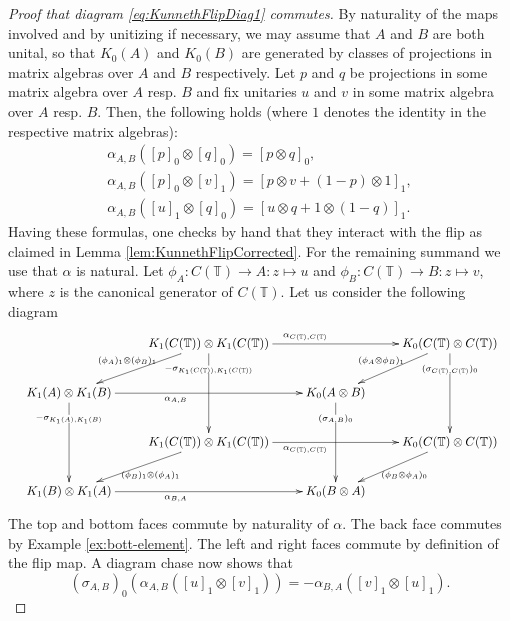 \documentclass[a4paper,10pt]{amsart}
\numberwithin{equation}{section}
\numberwithin{theorem}{section}
\begin{document}
\begin{proof}[Proof that diagram \eqref{eq:KunnethFlipDiag1} commutes] By naturality of the maps involved and by unitizing if necessary, we may assume that $A$ and $B$ are both unital, so that $K_0(A)$ and $K_0(B)$ are generated by classes of projections in matrix algebras over $A$ and $B$ respectively.
Let $p$ and $q$ be  projections in some matrix algebra over $A$ resp. $B$ and fix unitaries $u$ and $v$ in some matrix algebra over $A$ resp.  $B$. Then, the following holds (where $1$ denotes the identity in the respective matrix algebras):
\[
	\begin{array}{l}
		\alpha_{A,B}([p]_0 \otimes [q]_0) = [p \otimes q]_0, \\
		\alpha_{A,B}([p]_0 \otimes [v]_1) = [p \otimes v + (1-p) \otimes 1]_1, \\
		\alpha_{A,B}([u]_1 \otimes [q]_0) = [u \otimes q + 1 \otimes (1-q)]_1.
	\end{array}
\]
Having these formulas, one checks by hand that they interact with the flip as claimed in Lemma \ref{lem:KunnethFlipCorrected}. For the remaining summand we use that $\alpha$ is natural. Let $\phi_A \colon C(\mathbb T) \to A : z \mapsto u$ and $\phi_B \colon C(\mathbb T) \to B :  z \mapsto v$, where $z$ is the canonical generator of $C(\mathbb T)$. Let us consider the following diagram
\[		
	\resizebox{\textwidth}{!}{
	\xymatrix{
	& K_1(C(\mathbb T)) \otimes K_1(C(\mathbb T))  \ar[dd]|-(.2){-\sigma_{K_1(C(\mathbb T)),K_1(C(\mathbb T))}} \ar[dl]_-{(\phi_A)_1 \otimes (\phi_B)_1}  \ar[rr]^(.4){\alpha_{C(\mathbb T),C(\mathbb T)}}  & & K_0(C(\mathbb T) \otimes C(\mathbb T))  \ar[dl]_-{(\phi_A \otimes \phi_B)_1} \ar[dd]|-(.2){(\sigma_{C(\mathbb T),C(\mathbb T)})_0} \\
	K_1(A) \otimes K_1(B) \ar[rr]_(.4){\alpha_{A,B}} \ar[dd]|-(.2){-\sigma_{K_1(A),K_1(B)}}  & & K_0(A \otimes B) \ar[dd]|-(.2){(\sigma_{A,B})_0} \\
	& K_1(C(\mathbb T)) \otimes K_1(C(\mathbb T)) \ar[dl]^{(\phi_B)_1 \otimes (\phi_A)_1} \ar[rr]_(.4){\alpha_{C(\mathbb T),C(\mathbb T)}} & & K_0(C(\mathbb T) \otimes C(\mathbb T)) \ar[dl]^{(\phi_B \otimes \phi_A)_0} \\
	K_1(B) \otimes K_1(A) \ar[rr]_(.4){\alpha_{B,A}} & & K_0(B \otimes A)
	}
	}
\]
The top and bottom faces commute by naturality of $\alpha$. The back face commutes by Example \ref{ex:bott-element}. The left and right faces commute by definition of the flip map. A diagram chase now shows that 
$$
	(\sigma_{A,B})_0(\alpha_{A,B}([u]_1 \otimes [v]_1)) = - \alpha_{B,A}([v]_1 \otimes [u]_1).
$$
\end{proof}
\end{document}
